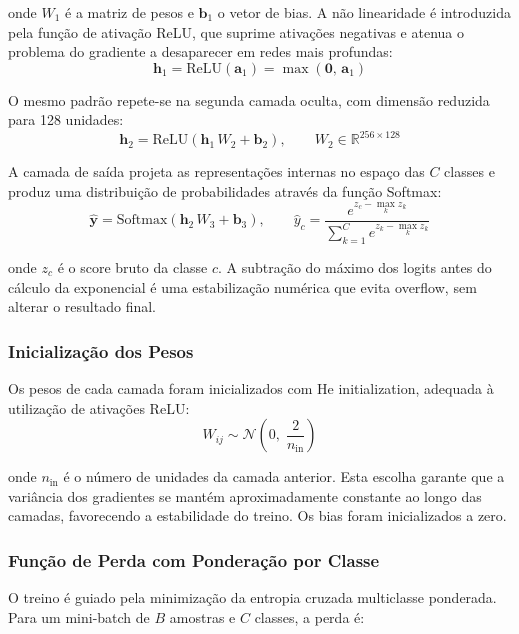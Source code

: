 \documentclass[a4paper,12pt]{scrreprt}
\begin{document}
            onde $W_1$ é a matriz de pesos e $\mathbf{b}_1$ o vetor de bias. A não linearidade é introduzida pela função de ativação ReLU, que suprime ativações negativas e atenua o problema do gradiente a desaparecer em redes mais profundas:
            \[
            \mathbf{h}_1 = \mathrm{ReLU}(\mathbf{a}_1) = \max(\mathbf{0},\, \mathbf{a}_1)
            \]

            O mesmo padrão repete-se na segunda camada oculta, com dimensão reduzida para 128 unidades:
            \[
            \mathbf{h}_2 = \mathrm{ReLU}\!\left(\mathbf{h}_1\,W_2 + \mathbf{b}_2\right), \qquad W_2 \in \mathbb{R}^{256 \times 128}
            \]

            A camada de saída projeta as representações internas no espaço das $C$ classes e produz uma distribuição de probabilidades através da função Softmax:
            \[
            \hat{\mathbf{y}} = \mathrm{Softmax}\!\left(\mathbf{h}_2\,W_3 + \mathbf{b}_3\right), \qquad \hat{y}_c = \frac{e^{z_c - \max_k z_k}}{\displaystyle\sum_{k=1}^{C} e^{z_k - \max_k z_k}}
            \]

            onde $z_c$ é o score bruto da classe $c$. A subtração do máximo dos logits antes do cálculo da exponencial é uma estabilização numérica que evita overflow, sem alterar o resultado final.

            \subsubsection*{Inicialização dos Pesos}

            Os pesos de cada camada foram inicializados com He initialization, adequada à utilização de ativações ReLU:
            \[
            W_{ij} \sim \mathcal{N}\!\left(0,\; \frac{2}{n_{\mathrm{in}}}\right)
            \]

            onde $n_{\mathrm{in}}$ é o número de unidades da camada anterior. Esta escolha garante que a variância dos gradientes se mantém aproximadamente constante ao longo das camadas, favorecendo a estabilidade do treino. Os bias foram inicializados a zero.

            \subsubsection*{Função de Perda com Ponderação por Classe}

            O treino é guiado pela minimização da entropia cruzada multiclasse ponderada. Para um mini-batch de $B$ amostras e $C$ classes, a perda é:
\end{document}
